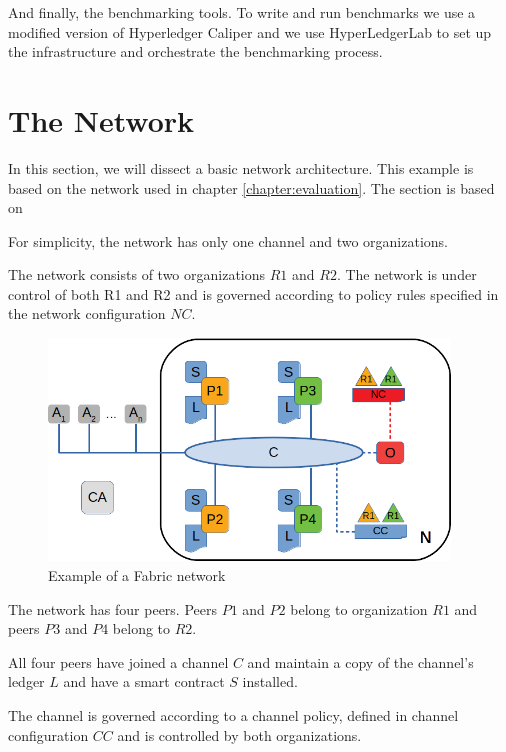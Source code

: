 And finally, the benchmarking tools. To write and run benchmarks we use a modified version of Hyperledger Caliper \cite{lit:caliper} and we use HyperLedgerLab \cite{lit:hyperledgerlab} to set up the infrastructure and orchestrate the benchmarking process.

\section{The Network}
\label{sec:network}

In this section, we will dissect a basic network architecture. This example is based on the network used in chapter \ref{chapter:evaluation}. The section is based on \cite{fabricdocs:network}

For simplicity, the network has only one channel and two organizations.

The network consists of two organizations $R1$ and $R2$. The network is under control of both R1 and R2 and is governed according to policy rules specified in the network configuration $NC$.

\begin{figure}
\begin{center}
\includegraphics[width=0.95\textwidth]{figures/network}
\end{center}
\caption{Example of a Fabric network}
\label{fig:net}
\end{figure}
\vspace{0.25cm}

The network has four peers. Peers $P1$ and $P2$ belong to organization $R1$ and peers $P3$ and $P4$ belong to $R2$.

All four peers have joined a channel $C$ and maintain a copy of the channel's ledger $L$ and have a smart contract $S$ installed.

The channel is governed according to a channel policy, defined in channel configuration $CC$ and is controlled by both organizations.

